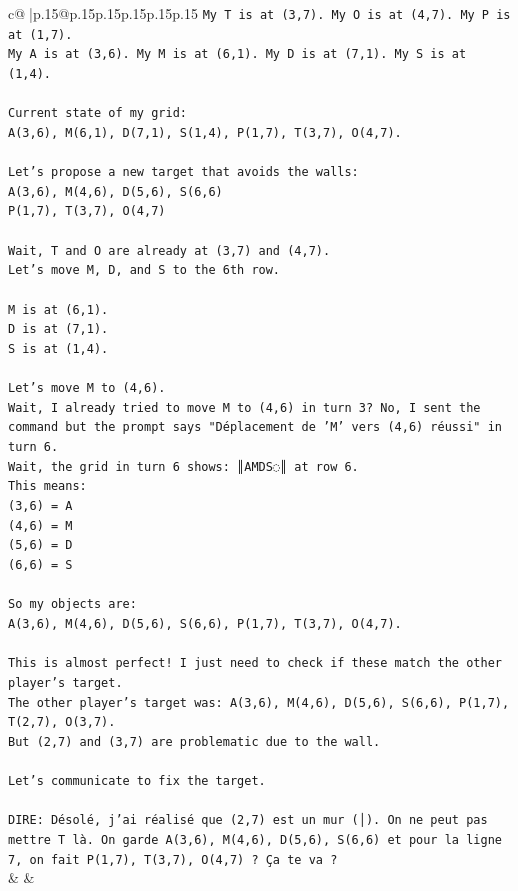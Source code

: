 \documentclass{article}
\begin{document}
{\begin{supertabular}{c@{$\;$}|p{.15\linewidth}@{}p{.15\linewidth}p{.15\linewidth}p{.15\linewidth}p{.15\linewidth}p{.15\linewidth}}
{{{\texttt{My T is at (3,7). My O is at (4,7). My P is at (1,7).} \\
\texttt{My A is at (3,6). My M is at (6,1). My D is at (7,1). My S is at (1,4).} \\
\\ 
\texttt{Current state of my grid:} \\
\texttt{A(3,6), M(6,1), D(7,1), S(1,4), P(1,7), T(3,7), O(4,7).} \\
\\ 
\texttt{Let's propose a new target that avoids the walls:} \\
\texttt{A(3,6), M(4,6), D(5,6), S(6,6)} \\
\texttt{P(1,7), T(3,7), O(4,7)} \\
\\ 
\texttt{Wait, T and O are already at (3,7) and (4,7).} \\
\texttt{Let's move M, D, and S to the 6th row.} \\
\\ 
\texttt{M is at (6,1).} \\
\texttt{D is at (7,1).} \\
\texttt{S is at (1,4).} \\
\\ 
\texttt{Let's move M to (4,6).} \\
\texttt{Wait, I already tried to move M to (4,6) in turn 3? No, I sent the command but the prompt says "Déplacement de 'M' vers (4,6) réussi" in turn 6.} \\
\texttt{Wait, the grid in turn 6 shows: ║AMDS◌║ at row 6.} \\
\texttt{This means:} \\
\texttt{(3,6) = A} \\
\texttt{(4,6) = M} \\
\texttt{(5,6) = D} \\
\texttt{(6,6) = S} \\
\\ 
\texttt{So my objects are:} \\
\texttt{A(3,6), M(4,6), D(5,6), S(6,6), P(1,7), T(3,7), O(4,7).} \\
\\ 
\texttt{This is almost perfect! I just need to check if these match the other player's target.} \\
\texttt{The other player's target was: A(3,6), M(4,6), D(5,6), S(6,6), P(1,7), T(2,7), O(3,7).} \\
\texttt{But (2,7) and (3,7) are problematic due to the wall.} \\
\\ 
\texttt{Let's communicate to fix the target.} \\
\\ 
\texttt{DIRE: Désolé, j'ai réalisé que (2,7) est un mur (│). On ne peut pas mettre T là. On garde A(3,6), M(4,6), D(5,6), S(6,6) et pour la ligne 7, on fait P(1,7), T(3,7), O(4,7) ? Ça te va ?} \\
            }
        }
    }
    & & \\ \\


\end{supertabular}}
\end{document}
